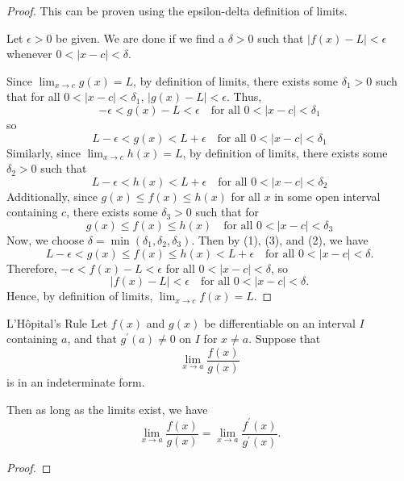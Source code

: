 \begin{proof}
This can be proven using the epsilon-delta definition of limits.

Let $\epsilon > 0$ be given. We are done if we find a $\delta > 0$ such that $|f(x)-L| < \epsilon$ whenever $0 < |x-c| < \delta$.

Since $\lim_{x\to c} g(x) = L$, by definition of limits, there exists some $\delta_1 > 0$ such that for all $0 < |x-c| < \delta_1$, $|g(x)-L| < \epsilon$.
Thus, 
\[ -\epsilon < g(x)-L < \epsilon \quad \text{for all } 0 < |x-c| < \delta_1 \]
so
\begin{equation*}\tag{1}
L-\epsilon < g(x) < L + \epsilon \quad \text{for all } 0 < |x-c| < \delta_1
\end{equation*}
Similarly, since $\lim_{x\to c} h(x) = L$, by definition of limits, there exists some $\delta_2 > 0$ such that
\begin{equation*}\tag{2}
L-\epsilon < h(x) < L + \epsilon \quad \text{for all } 0 < |x-c| < \delta_2
\end{equation*}
Additionally, since $g(x) \le f(x) \le h(x)$ for all $x$ in some open interval containing $c$, there exists some $\delta_3 > 0$ such that for 
\begin{equation*}\tag{3}
g(x) \le f(x) \le h(x) \quad \text{for all } 0 < |x-c| < \delta_3
\end{equation*}
Now, we choose $\delta = \min(\delta_1, \delta_2, \delta_3)$. Then by (1), (3), and (2), we have 
\[ L-\epsilon < g(x) \le f(x) \le h(x) < L + \epsilon \quad \text{for all } 0 < |x-c| < \delta. \]
Therefore, $-\epsilon < f(x)-L < \epsilon$ for all $0 < |x-c| < \delta$, so
\[ |f(x)-L| < \epsilon \quad \text{for all } 0 < |x-c| < \delta. \]
Hence, by definition of limits, $\lim_{x\to c} f(x) = L$.
\end{proof}

\begin{thrm}{L'H\^{o}pital's Rule}{}
Let $f(x)$ and $g(x)$ be differentiable on an interval $I$ containing $a$, and that $g^\prime(a) \neq 0$ on $I$ for $x \neq a$. Suppose that
\[ \lim_{x\to a}\frac{f(x)}{g(x)} \]
is in an indeterminate form. 

Then as long as the limits exist, we have 
\[ \lim_{x\to a}\frac{f(x)}{g(x)} = \lim_{x\to a}\frac{f^\prime(x)}{g^\prime(x)}. \]
\end{thrm}

\begin{proof}

\end{proof}
\pagebreak

